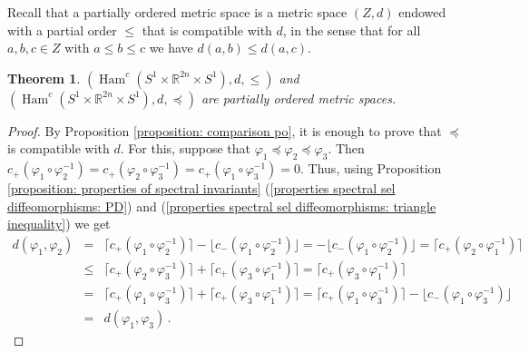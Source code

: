 \documentclass{amsart}
\DeclareMathOperator{\Ham}{Ham}
\newtheorem{thm}{Theorem}[section]
\theoremstyle{remark}
\begin{document}
Recall that a partially ordered metric space
is a metric space $(Z, d)$
endowed with a partial order $\leq$
that is compatible with $d$,
in the sense that for all $a, b, c \in Z$
with $a \leq b \leq c$
we have $d (a, b) \leq d (a, c)$.

\begin{thm}\label{theorem: partiall ordered metric spaces}
$(\Ham^c (S^1 \times \mathbb{R}^{2n} \times S^1), d, \leq)$
and $(\Ham^c (S^1 \times \mathbb{R}^{2n} \times S^1), d, \preceq)$
are partially ordered metric spaces.
\end{thm}

\begin{proof}
By Proposition \ref{proposition: comparison po},
it is enough to prove that $\preceq$ is compatible with $d$.
For this,
suppose that $\varphi_1 \preceq \varphi_2 \preceq \varphi_3$.
Then $c_+ (\varphi_1 \circ \varphi_2^{-1})
= c_+ (\varphi_2 \circ \varphi_3^{-1})
= c_
+ (\varphi_1 \circ \varphi_3^{-1}) = 0$.
Thus, using Proposition \ref{proposition: properties of spectral invariants}
(\ref{properties spectral sel diffeomorphisms: PD})
and (\ref{properties spectral sel diffeomorphisms: triangle inequality})
we get
\begin{eqnarray*}
d (\varphi_1, \varphi_2)
&=&\lceil c_+ (\varphi_1 \circ \varphi_2^{-1})\rceil
- \lfloor c_- (\varphi_1 \circ \varphi_2^{-1})\rfloor
= - \lfloor c_- (\varphi_1 \circ \varphi_2^{-1})\rfloor
= \lceil c_+ (\varphi_2 \circ \varphi_1^{-1})\rceil \\
&\leq& \lceil c_+(\varphi_2 \circ \varphi_3^{-1})\rceil
+ \lceil c_+(\varphi_3 \circ \varphi_1^{-1})\rceil
=\lceil c_+(\varphi_3 \circ \varphi_1^{-1})\rceil \\
&=& \lceil c_+ (\varphi_1 \circ \varphi_3^{-1})\rceil
+ \lceil c_+ (\varphi_3 \circ \varphi_1^{-1})\rceil
= \lceil c_+ (\varphi_1 \circ \varphi_3^{-1})\rceil
- \lfloor c_- (\varphi_1 \circ \varphi_3^{-1})\rfloor \\
&=& d(\varphi_1, \varphi_3) \,.
\end{eqnarray*}
\end{proof}
\end{document}
